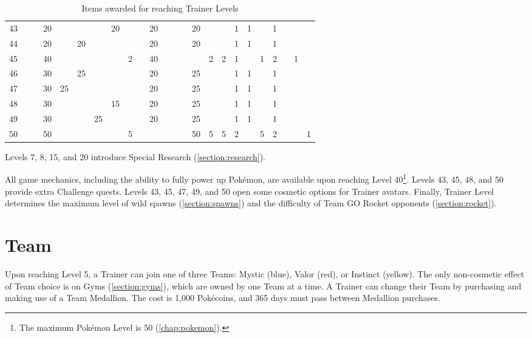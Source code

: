 \begin{table}[t]
\begin{center}
\begin{tabular}{r|g c g c g c g c g c g c g c g c g c g c g c g}
   43 &    &    & 20 &    &    &    & 20 &   &    & 20 &    &    &    & 20 &   &   & 1  & 1 &   & 1 &   &   &   \\
   44 &    &    & 20 &    & 20 &    &    &   &    & 20 &    &    &    & 20 &   &   & 1  & 1 &   & 1 &   &   &   \\
   45 &    &    & 40 &    &    &    &    & 2 &    & 40 &    &    &    &    & 2 & 2 & 1  &   & 1 & 2 &   & 1 &   \\
   46 &    &    & 30 &    & 25 &    &    &   &    & 20 &    &    &    & 25 &   &   & 1  & 1 &   & 1 &   &   &   \\
   47 &    &    & 30 & 25 &    &    &    &   &    & 20 &    &    &    & 25 &   &   & 1  & 1 &   & 1 &   &   &   \\
   48 &    &    & 30 &    &    &    & 15 &   &    & 20 &    &    &    & 25 &   &   & 1  & 1 &   & 1 &   &   &   \\
   49 &    &    & 30 &    &    & 25 &    &   &    & 20 &    &    &    & 25 &   &   & 1  & 1 &   & 1 &   &   &   \\
   50 &    &    & 50 &    &    &    &    & 5 &    &    &    &    &    & 50 & 5 & 5 & 2  &   & 5 & 2 &   &   & 1 \\
\end{tabular}
\caption{Items awarded for reaching Trainer Levels}
\label{table:levelitems}
\end{center}
\end{table}
Levels 7, 8, 15, and 20 introduce Special Research (\autoref{section:research}).

All game mechanics, including the ability to fully power up Pokémon,
 are available upon reaching Level 40\footnote{The maximum Pokémon Level is 50 (\autoref{chap:pokemon}).}.
Levels 43, 45, 48, and 50 provide extra Challenge quests.
Levels 43, 45, 47, 49, and 50 open some cosmetic options for Trainer avatars.
Finally, Trainer Level determines the maximum level of wild spawns
  (\autoref{section:spawns}) and the difficulty of Team GO Rocket
  opponents (\autoref{section:rocket}).

\section{Team}
Upon reaching Level 5, a Trainer can join one of three Teams: Mystic (blue),
  Valor (red), or Instinct (yellow).
The only non-cosmetic effect of Team choice is on Gyms (\autoref{section:gyms}), which
  are owned by one Team at a time.
A Trainer can change their Team by purchasing and making use of a Team Medallion.
The cost is 1,000 Pokécoins, and 365 days must pass between Medallion purchases.

